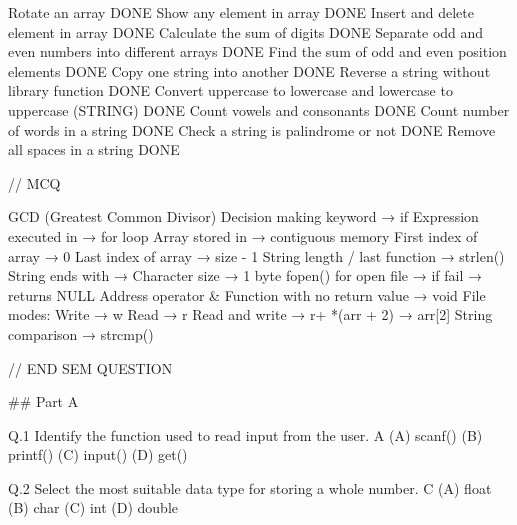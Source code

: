 Rotate an array                                                                                    DONE
Show any element in array                                                                          DONE                                                                                                                                        
Insert and delete element in array                                                                 DONE
Calculate the sum of digits                                                                        DONE
Separate odd and even numbers into different arrays                                                DONE
Find the sum of odd and even position elements                                                     DONE
Copy one string into another                                                                       DONE
Reverse a string without library function                                                          DONE
Convert uppercase to lowercase and lowercase to uppercase (STRING)                                 DONE
Count vowels and consonants                                                                        DONE
Count number of words in a string                                                                  DONE
Check a string is palindrome or not                                                                DONE
Remove all spaces in a string                                                                      DONE


// MCQ

GCD (Greatest Common Divisor)
Decision making keyword → if
Expression executed in → for loop
Array stored in → contiguous memory
First index of array → 0
Last index of array → size - 1
String length / last function → strlen()
String ends with → \0
Character size → 1 byte
fopen() for open file → if fail → returns NULL
Address operator &
Function with no return value → void
File modes:
Write → w
Read → r
Read and write → r+
*(arr + 2) → arr[2]
String comparison → strcmp()


  




// END SEM QUESTION

## Part A

Q.1 Identify the function used to read input from the user.                               A
(A) scanf()
(B) printf()
(C) input()
(D) get()

Q.2 Select the most suitable data type for storing a whole number.                       C
(A) float
(B) char
(C) int
(D) double

